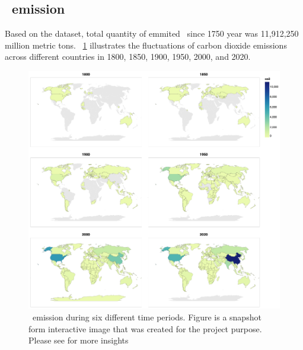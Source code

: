 \subsection{\coo\ emission}

Based on the dataset, total quantity of emmited \coo\ since 1750 year was 11,912,250 million metric tons. 
~\ref{fig:co2_emission_global} illustrates the fluctuations of carbon dioxide emissions across different countries in 1800, 1850, 1900, 1950, 2000, and 2020.
\begin{figure}[h]
  \includegraphics[width=\linewidth]{img/co2emission.png}
  \caption{\coo\ emission during six different time periods. Figure is a snapshot form interactive image that was created for the project purpose. Please see \cite{berkeleyearthdata} for more insights} 
  \label{fig:co2_emission_global}
\end{figure}

